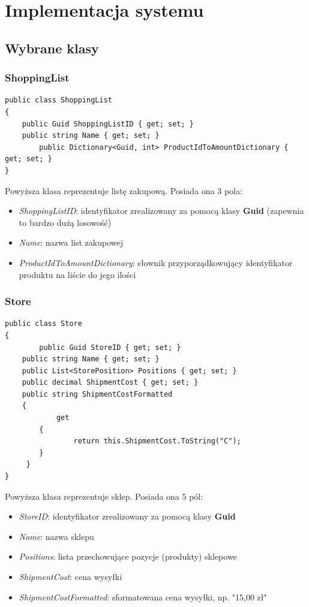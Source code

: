\documentclass[a4paper]{article}
\let\oldsection\section
\renewcommand\section{\clearpage\oldsection}
\begin{document}
\section{Implementacja systemu}
\subsection{Wybrane klasy}
\subsubsection{ShoppingList}
\lstset{style=sharpc}
\begin{lstlisting}
public class ShoppingList
{
    public Guid ShoppingListID { get; set; }
    public string Name { get; set; }
		public Dictionary<Guid, int> ProductIdToAmountDictionary { get; set; }
}
\end{lstlisting}
\begin{flushleft}
Powyższa klasa reprezentuje listę zakupową. Posiada ona 3 pola: 
\begin{itemize}
\item \textit{ShoppingListID}: identyfikator zrealizowany za pomocą klasy \textbf{Guid} (zapewnia to bardzo dużą losowość)
\item \textit{Name}: nazwa list zakupowej
\item \textit{ProductIdToAmountDictionary}: słownik przyporządkowujący identyfikator produktu na liście do jego ilości
\end{itemize}
\end{flushleft}
\subsubsection{Store}
\lstset{style=sharpc}
\begin{lstlisting}
public class Store
{           
		public Guid StoreID { get; set; }
    public string Name { get; set; }
    public List<StorePosition> Positions { get; set; }
    public decimal ShipmentCost { get; set; }
    public string ShipmentCostFormatted
    {
    		get
        {
        		return this.ShipmentCost.ToString("C");
        }
     }
}
\end{lstlisting}
\begin{flushleft}
Powyższa klasa reprezentuje sklep. Posiada ona 5 pól: 
\begin{itemize}
\item \textit{StoreID}: identyfikator zrealizowany za pomocą klasy \textbf{Guid} 
\item \textit{Name}: nazwa sklepu
\item \textit{Positions}: lista przechowujące pozycje (produkty) sklepowe
\item \textit{ShipmentCost}: cena wysyłki
\item \textit{ShipmentCostFormatted}: sformatowana cena wysyłki, np. "15,00 zł"
\end{itemize}
\end{flushleft}
\end{document}
